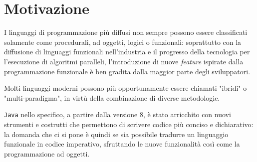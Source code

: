 \section{Motivazione}
\label{sec:1-1-motivation}

I linguaggi di programmazione più diffusi non sempre possono essere classificati
solamente come procedurali, ad oggetti, logici o funzionali: soprattutto con la diffusione di linguaggi funzionali
nell'industria e il progresso della tecnologia per l'esecuzione di algoritmi paralleli, l'introduzione di nuove \textit{feature}
ispirate dalla programmazione funzionale è ben gradita dalla maggior parte degli sviluppatori.

\noindent Molti linguaggi moderni possono più opportunamente essere chiamati "ibridi" o "multi-paradigma",
in virtù della combinazione di diverse metodologie.


\texttt{Java} nello specifico, a partire dalla versione 8, è stato arricchito con nuovi strumenti e costrutti
che permettono di scrivere codice più conciso e dichiarativo: la domanda che ci si pone è quindi se sia possibile tradurre
un linguaggio funzionale in codice imperativo, sfruttando le nuove funzionalità così come la programmazione ad oggetti.